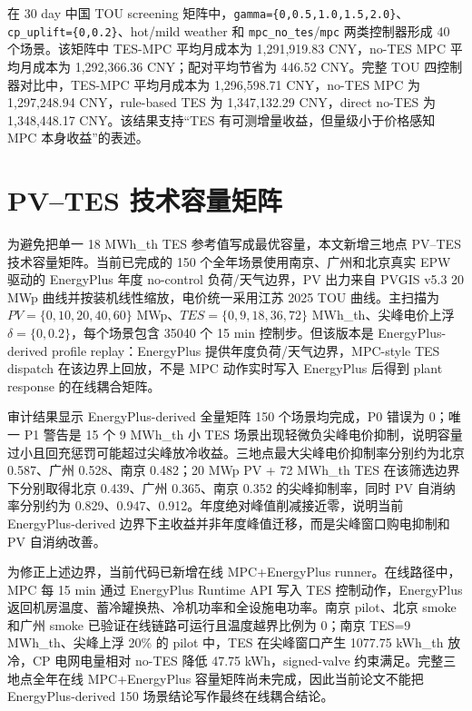 \documentclass[UTF8,a4paper,12pt]{ctexrep}
\begin{document}
在 30 day 中国 TOU screening 矩阵中，\texttt{gamma=\{0,0.5,1.0,1.5,2.0\}}、\texttt{cp\_uplift=\{0,0.2\}}、hot/mild weather 和 \texttt{mpc\_no\_tes}/\texttt{mpc} 两类控制器形成 40 个场景。该矩阵中 TES-MPC 平均月成本为 1,291,919.83 CNY，no-TES MPC 平均月成本为 1,292,366.36 CNY；配对平均节省为 446.52 CNY。完整 TOU 四控制器对比中，TES-MPC 平均月成本为 1,296,598.71 CNY，no-TES MPC 为 1,297,248.94 CNY，rule-based TES 为 1,347,132.29 CNY，direct no-TES 为 1,348,448.17 CNY。该结果支持“TES 有可测增量收益，但量级小于价格感知 MPC 本身收益”的表述。

\section{PV--TES 技术容量矩阵}

为避免把单一 18 MWh\_th TES 参考值写成最优容量，本文新增三地点 PV--TES 技术容量矩阵。当前已完成的 150 个全年场景使用南京、广州和北京真实 EPW 驱动的 EnergyPlus 年度 no-control 负荷/天气边界，PV 出力来自 PVGIS v5.3 20 MWp 曲线并按装机线性缩放，电价统一采用江苏 2025 TOU 曲线。主扫描为 $PV=\{0,10,20,40,60\}$ MWp、$TES=\{0,9,18,36,72\}$ MWh\_th、尖峰电价上浮 $\delta=\{0,0.2\}$，每个场景包含 35040 个 15 min 控制步。但该版本是 EnergyPlus-derived profile replay：EnergyPlus 提供年度负荷/天气边界，MPC-style TES dispatch 在该边界上回放，不是 MPC 动作实时写入 EnergyPlus 后得到 plant response 的在线耦合矩阵。

审计结果显示 EnergyPlus-derived 全量矩阵 150 个场景均完成，P0 错误为 0；唯一 P1 警告是 15 个 9 MWh\_th 小 TES 场景出现轻微负尖峰电价抑制，说明容量过小且回充惩罚可能超过尖峰放冷收益。三地点最大尖峰电价抑制率分别约为北京 0.587、广州 0.528、南京 0.482；20 MWp PV + 72 MWh\_th TES 在该筛选边界下分别取得北京 0.439、广州 0.365、南京 0.352 的尖峰抑制率，同时 PV 自消纳率分别约为 0.829、0.947、0.912。年度绝对峰值削减接近零，说明当前 EnergyPlus-derived 边界下主收益并非年度峰值迁移，而是尖峰窗口购电抑制和 PV 自消纳改善。

为修正上述边界，当前代码已新增在线 MPC+EnergyPlus runner。在线路径中，MPC 每 15 min 通过 EnergyPlus Runtime API 写入 TES 控制动作，EnergyPlus 返回机房温度、蓄冷罐换热、冷机功率和全设施电功率。南京 pilot、北京 smoke 和广州 smoke 已验证在线链路可运行且温度越界比例为 0；南京 TES=9 MWh\_th、尖峰上浮 20\% 的 pilot 中，TES 在尖峰窗口产生 1077.75 kWh\_th 放冷，CP 电网电量相对 no-TES 降低 47.75 kWh，signed-valve 约束满足。完整三地点全年在线 MPC+EnergyPlus 容量矩阵尚未完成，因此当前论文不能把 EnergyPlus-derived 150 场景结论写作最终在线耦合结论。
\end{document}
